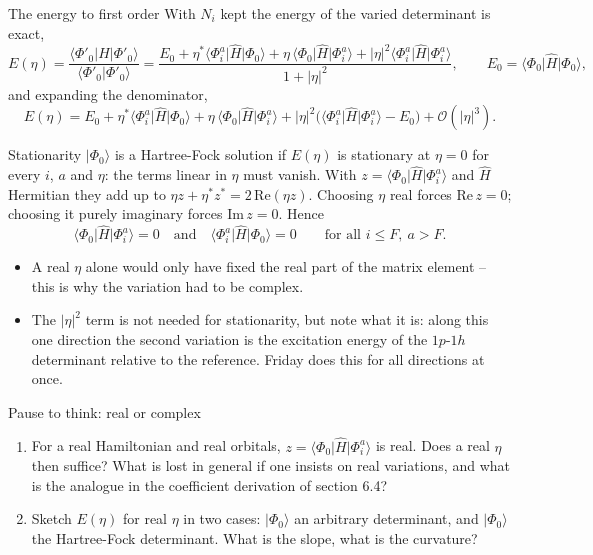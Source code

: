 \documentclass[aspectratio=169,10pt]{beamer}
\newcounter{thinkctr}
\newcommand{\thinkq}[2]{%
  \stepcounter{thinkctr}%
  \begin{tcolorbox}[colback=palewarm,colframe=warm,title={\bfseries Pause to think \#\thethinkctr\hfill\mdseries\small(about #1 min -- discuss with your neighbour)},fonttitle=\bfseries]
  #2
  \end{tcolorbox}}
\newcommand{\ket}[1]{\vert #1\rangle}
\newcommand{\bra}[1]{\langle #1\vert}
\newcommand{\braket}[2]{\langle #1\vert #2\rangle}
\newcommand{\element}[3]{\langle #1\vert #2\vert #3\rangle}
\newcommand{\bigO}{\mathcal{O}}
\begin{document}
\begin{frame}{The energy to first order}
  \footnotesize
  With $N_i$ kept the energy of the varied determinant is exact,
  \[
    E(\eta)=\frac{\bra{\Phi'_0}\hat{H}\ket{\Phi'_0}}{\braket{\Phi'_0}{\Phi'_0}}
    =\frac{E_0+\eta^{*}\element{\Phi_i^a}{\hat{H}}{\Phi_0}+\eta\,\element{\Phi_0}{\hat{H}}{\Phi_i^a}+|\eta|^2\element{\Phi_i^a}{\hat{H}}{\Phi_i^a}}{1+|\eta|^2},
    \qquad E_0=\element{\Phi_0}{\hat{H}}{\Phi_0},
  \]
  and expanding the denominator,
  \[
    E(\eta)=E_0+\eta^{*}\element{\Phi_i^a}{\hat{H}}{\Phi_0}+\eta\,\element{\Phi_0}{\hat{H}}{\Phi_i^a}
    +|\eta|^2\bigl(\element{\Phi_i^a}{\hat{H}}{\Phi_i^a}-E_0\bigr)+\bigO(|\eta|^3).
  \]
  \begin{block}{Stationarity}
    $\ket{\Phi_0}$ is a Hartree-Fock solution if $E(\eta)$ is stationary at $\eta=0$ for every $i$, $a$ and $\eta$: the terms linear in $\eta$ must vanish. With $z=\element{\Phi_0}{\hat{H}}{\Phi_i^a}$ and $\hat{H}$ Hermitian they add up to $\eta z+\eta^{*}z^{*}=2\,\mathrm{Re}(\eta z)$. Choosing $\eta$ real forces $\mathrm{Re}\,z=0$; choosing it purely imaginary forces $\mathrm{Im}\,z=0$. Hence
    \[
      \element{\Phi_0}{\hat{H}}{\Phi_i^a}=0\quad\text{and}\quad\element{\Phi_i^a}{\hat{H}}{\Phi_0}=0\qquad\text{for all }i\le F,\ a>F .
    \]
  \end{block}
  \begin{itemize}
    \item A real $\eta$ alone would only have fixed the real part of the matrix element -- this is why the variation had to be complex.
    \item The $|\eta|^2$ term is not needed for stationarity, but note what it is: along this one direction the second variation is the excitation energy of the $1p$-$1h$ determinant relative to the reference. Friday does this for all directions at once.
  \end{itemize}
\end{frame}

\begin{frame}{Pause to think: real or complex}
  \thinkq{3}{
  \begin{enumerate}
    \item For a real Hamiltonian and real orbitals, $z=\element{\Phi_0}{\hat{H}}{\Phi_i^a}$ is real. Does a real $\eta$ then suffice? What is lost in general if one insists on real variations, and what is the analogue in the coefficient derivation of section 6.4?
    \item Sketch $E(\eta)$ for real $\eta$ in two cases: $\ket{\Phi_0}$ an arbitrary determinant, and $\ket{\Phi_0}$ the Hartree-Fock determinant. What is the slope, what is the curvature?
  \end{enumerate}}
\end{frame}
\end{document}
